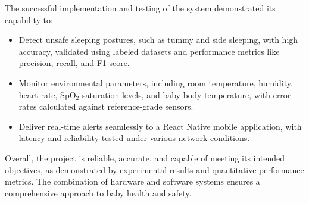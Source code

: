 \documentclass[12pt,a4paper]{report}
\begin{document}
The successful implementation and testing of the system demonstrated its capability to:
\begin{itemize}
    \item Detect unsafe sleeping postures, such as tummy and side sleeping, with high accuracy, validated using labeled datasets and performance metrics like precision, recall, and F1-score.
    \item Monitor environmental parameters, including room temperature, humidity, heart rate, SpO$_2$ saturation levels, and baby body temperature, with error rates calculated against reference-grade sensors.
    \item Deliver real-time alerts seamlessly to a React Native mobile application, with latency and reliability tested under various network conditions.
\end{itemize}

Overall, the project is reliable, accurate, and capable of meeting its intended objectives, as demonstrated by experimental results and quantitative performance metrics. The combination of hardware and software systems ensures a comprehensive approach to baby health and safety.
\end{document}
